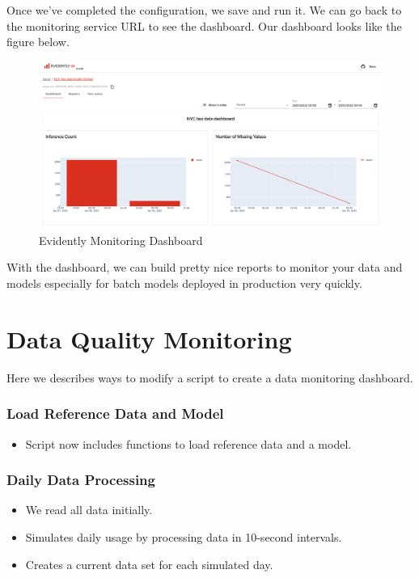 \documentclass[letterpaper,12pt,notitlepage,twoside]{report}
\begin{document}
Once we've completed the configuration, we save and run it. We can go back to the monitoring service URL to see the dashboard.  Our dashboard looks like the figure below.
\begin{figure}[h]
	\centering
	\includegraphics[width=\textwidth]{Images/evidently-dashboard.png}
	\caption{Evidently Monitoring Dashboard}
	\label{fig:13}
\end{figure}
\FloatBarrier
With the dashboard, we can build pretty nice reports to monitor your data and models especially for batch models deployed in production very quickly.

\section{Data Quality Monitoring}
Here we describes ways to modify a script to create a data monitoring dashboard. 
\subsubsection{Load Reference Data and Model}
\begin{itemize}[noitemsep, topsep=0pt]
\item Script now includes functions to load reference data and a model.
\end{itemize}
\subsubsection{Daily Data Processing}
\begin{itemize}[noitemsep, topsep=0pt]
\item We read all data initially.
\item Simulates daily usage by processing data in 10-second intervals.
\item Creates a current data set for each simulated day.
\end{itemize}
\end{document}
